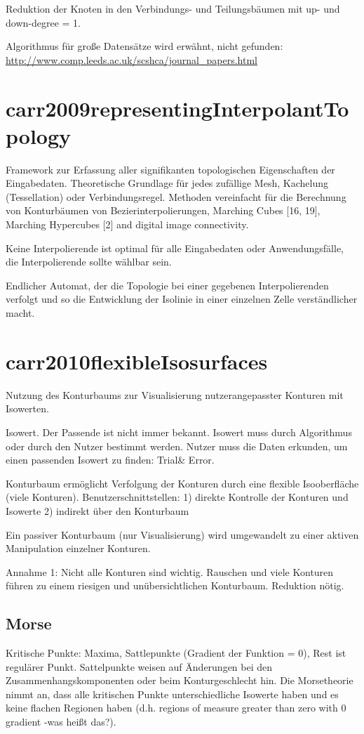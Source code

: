 Reduktion der Knoten in den Verbindungs- und Teilungsbäumen mit up- und down-degree = 1.

Algorithmus für große Datensätze wird erwähnt, nicht gefunden: \url{http://www.comp.leeds.ac.uk/scshca/journal_papers.html}


\section{carr2009representingInterpolantTopology}
Framework zur Erfassung aller signifikanten topologischen Eigenschaften der Eingabedaten. Theoretische Grundlage für jedes zufällige Mesh, Kachelung (Tessellation) oder Verbindungsregel. Methoden vereinfacht für die Berechnung von Konturbäumen von Bezierinterpolierungen, Marching Cubes [16, 19], Marching Hypercubes [2] and digital image connectivity.

Keine Interpolierende ist optimal für alle Eingabedaten oder Anwendungsfälle, die Interpolierende sollte wählbar sein.

Endlicher Automat, der die Topologie bei einer gegebenen Interpolierenden verfolgt und so die Entwicklung der Isolinie in einer einzelnen Zelle verständlicher macht.


\section{carr2010flexibleIsosurfaces}
Nutzung des Konturbaums zur Visualisierung nutzerangepasster Konturen mit Isowerten.

Isowert. Der Passende ist nicht immer bekannt. Isowert muss durch Algorithmus oder durch den Nutzer bestimmt werden. Nutzer muss die Daten erkunden, um einen passenden Isowert zu finden: Trial\& Error.

\cite[S.~43]{carr2010flexibleIsosurfaces}
Konturbaum ermöglicht Verfolgung der Konturen durch eine flexible Isooberfläche (viele Konturen). Benutzerschnittstellen:
1) direkte Kontrolle der Konturen und Isowerte
2) indirekt über den Konturbaum

Ein passiver Konturbaum (nur Visualisierung) wird umgewandelt zu einer aktiven Manipulation einzelner Konturen.

Annahme 1: Nicht alle Konturen sind wichtig.
Rauschen und viele Konturen führen zu einem riesigen und unübersichtlichen Konturbaum. Reduktion nötig.

\subsection{Morse}
Kritische Punkte: Maxima, Sattlepunkte (Gradient der Funktion = 0), Rest ist regulärer Punkt. Sattelpunkte weisen auf Änderungen bei den Zusammenhangskomponenten oder beim Konturgeschlecht hin.
Die Morsetheorie nimmt an, dass alle kritischen Punkte unterschiedliche Isowerte haben und es keine flachen Regionen haben (d.h. regions of measure greater than zero with 0 gradient -was heißt das?).

